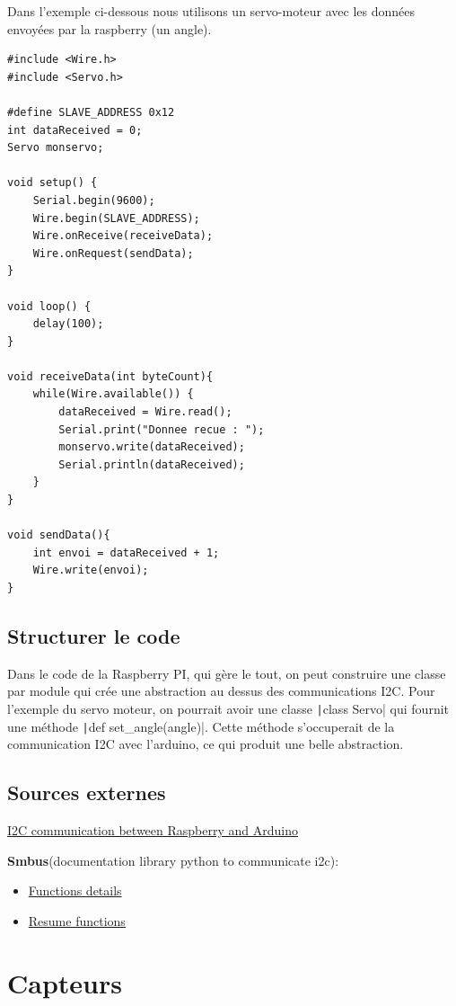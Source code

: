 \documentclass{eurobot_report}
\begin{document}
Dans l'exemple ci-dessous nous utilisons un servo-moteur avec les données envoyées par la raspberry (un angle).
\begin{verbatim}
#include <Wire.h>
#include <Servo.h>

#define SLAVE_ADDRESS 0x12
int dataReceived = 0;
Servo monservo;

void setup() {
    Serial.begin(9600);
    Wire.begin(SLAVE_ADDRESS);
    Wire.onReceive(receiveData);
    Wire.onRequest(sendData);
}

void loop() {
    delay(100);
}

void receiveData(int byteCount){
    while(Wire.available()) {
        dataReceived = Wire.read();
        Serial.print("Donnee recue : ");
        monservo.write(dataReceived);
        Serial.println(dataReceived);
    }
}

void sendData(){
    int envoi = dataReceived + 1;
    Wire.write(envoi);
}
\end{verbatim}


\section{Structurer le code}
Dans le code de la Raspberry PI, qui gère le tout, on peut construire une classe par module qui crée une abstraction au dessus des communications I2C. Pour l'exemple du servo moteur, on pourrait avoir une classe \texttt|class Servo| qui fournit une méthode \texttt|def set_angle(angle)|. Cette méthode s'occuperait de la communication I2C avec l'arduino, ce qui produit une belle abstraction.

\section{Sources externes}
\href{http://www.pihomeserver.fr/2013/08/13/raspberry-pi-home-server-arduino-lier-les-deux-via-bus-i2c/}{I2C communication between Raspberry and Arduino}

\textbf{Smbus}(documentation library python to communicate i2c):
\begin{itemize}
\item \href{https://www.mjmwired.net/kernel/Documentation/i2c/smbus-protocol}{Functions details}
\item \href{http://wiki.erazor-zone.de/wiki:linux:python:smbus:doc}{Resume functions}
\end{itemize}

\chapter{Capteurs}
\end{document}
